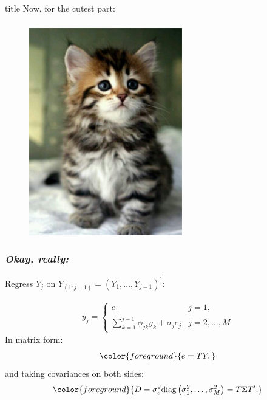 \documentclass[12pt]{beamer}
\newcommand{\newmaththought}[1]{{ \color{foreground} {#1}}}
\newcommand{\ms}{\scriptscriptstyle}
\begin{document}
\begin{frame}
\frametitle{}

\vfill
  \begin{beamercolorbox}[center]{title}
\Large Now, for the cutest part:
  \end{beamercolorbox}
  \vfill

\end{frame}




\begin{frame}
\frametitle{}
\begin{figure}
\graphicspath{{img/}}
  \includegraphics[height=9cm]{cutest-kitten-ever}
\end{figure}

\end{frame}

\begin{frame}
\frametitle{\emph{Okay, really:}}

Regress $Y_j$ on $Y_{\ms{\left(1:j-1\right)}} = \left(Y_1, \dots, Y_{\ms{j-1}}\right)^\prime$:

\begin{align} \label{eq:ARmodel}
y_{j}  = \left\{  \begin{array}{ll} 
		e_1 &j=1, \\
  \sum \limits_{k=1}^{j-1} \phi_{jk} y_{k} + \sigma_{j}e_{j} &  j=2,\dots,M
\end{array}\right.
\end{align}
\noindent
In matrix form:
\begin{align}
\newmaththought{ e = TY,}
\end{align}
\noindent
 and taking covariances on both sides:
\begin{equation}
\newmaththought{ D = \sigma_{\ms e}^2 \mbox{diag}\left( \sigma_1^2,\dots, \sigma_M^2 \right) = T \Sigma T^\prime.}
\end{equation}
\end{frame}
\end{document}
